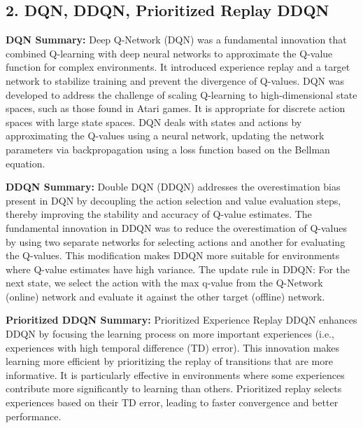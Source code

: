 \documentclass[a4paper,10pt]{article}
\begin{document}
\begin{multicols}{2}
\section*{2. DQN, DDQN, Prioritized Replay DDQN}
\textbf{DQN Summary:} Deep Q-Network (DQN) was a fundamental innovation that combined Q-learning with deep neural networks to approximate the Q-value function for complex environments. It introduced experience replay and a target network to stabilize training and prevent the divergence of Q-values. DQN was developed to address the challenge of scaling Q-learning to high-dimensional state spaces, such as those found in Atari games. It is appropriate for discrete action spaces with large state spaces. DQN deals with states and actions by approximating the Q-values using a neural network, updating the network parameters via backpropagation using a loss function based on the Bellman equation.

\textbf{DDQN Summary:} Double DQN (DDQN) addresses the overestimation bias present in DQN by decoupling the action selection and value evaluation steps, thereby improving the stability and accuracy of Q-value estimates. The fundamental innovation in DDQN was to reduce the overestimation of Q-values by using two separate networks for selecting actions and another for evaluating the Q-values. This modification makes DDQN more suitable for environments where Q-value estimates have high variance. The update rule in DDQN: For the next state, we select the action with the max q-value from the Q-Network (online) network and evaluate it against the other target (offline) network.

\textbf{Prioritized DDQN Summary:} Prioritized Experience Replay DDQN enhances DDQN by focusing the learning process on more important experiences (i.e., experiences with high temporal difference (TD) error). This innovation makes learning more efficient by prioritizing the replay of transitions that are more informative. It is particularly effective in environments where some experiences contribute more significantly to learning than others. Prioritized replay selects experiences based on their TD error, leading to faster convergence and better performance.


\end{multicols}
\end{document}
